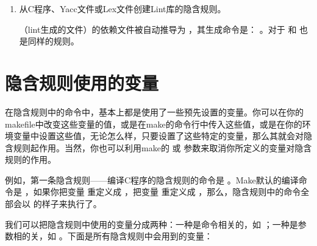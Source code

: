 \documentclass[a4paper,10pt]{sphinxmanual}
\begin{document}
\begin{enumerate}
\item {} 
从C程序、Yacc文件或Lex文件创建Lint库的隐含规则。

  （lint生成的文件）的依赖文件被自动推导为  ，其生成命令是：
 。对于  和  也是同样的规则。

\end{enumerate}


\section{隐含规则使用的变量}
\label{\detokenize{implicit_rules:id4}}
在隐含规则中的命令中，基本上都是使用了一些预先设置的变量。你可以在你的makefile中改变这些变量的值，或是在make的命令行中传入这些值，或是在你的环境变量中设置这些值，无论怎么样，只要设置了这些特定的变量，那么其就会对隐含规则起作用。当然，你也可以利用make的  或 
参数来取消你所定义的变量对隐含规则的作用。

例如，第一条隐含规则——编译C程序的隐含规则的命令是  。Make默认的编译命令是  ，如果你把变量  重定义成  ，把变量 
重定义成  ，那么，隐含规则中的命令全部会以  的样子来执行了。

我们可以把隐含规则中使用的变量分成两种：一种是命令相关的，如  ；一种是参数相的关，如
 。下面是所有隐含规则中会用到的变量：
\end{document}
